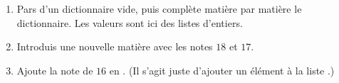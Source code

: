 \documentclass[11pt,class=report,crop=false]{standalone}
\begin{document}
\begin{activite}
\begin{enumerate}
  \begin{enumerate} 
    \item Pars d'un dictionnaire  vide, puis complète matière par matière le dictionnaire. Les valeurs sont ici des listes d'entiers.
    \item Introduis une nouvelle matière  avec les notes $18$ et $17$.
    \item Ajoute la note de $16$ en . (Il s'agit juste d'ajouter un élément à la liste .)
  \end{enumerate}  
\end{enumerate}

\end{activite}



\end{document}
